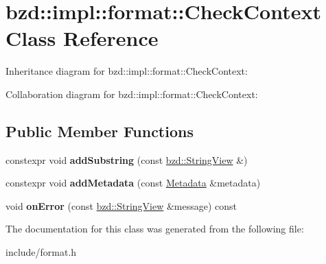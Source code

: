 \hypertarget{classbzd_1_1impl_1_1format_1_1CheckContext}{}\section{bzd\+:\+:impl\+:\+:format\+:\+:Check\+Context Class Reference}
\label{classbzd_1_1impl_1_1format_1_1CheckContext}


Inheritance diagram for bzd\+:\+:impl\+:\+:format\+:\+:Check\+Context\+:


Collaboration diagram for bzd\+:\+:impl\+:\+:format\+:\+:Check\+Context\+:
\subsection*{Public Member Functions}
\begin{DoxyCompactItemize}
\item 
\mbox{\label{classbzd_1_1impl_1_1format_1_1CheckContext_ad7d6065fd6ed9dbb89693b2c93963f61}} 
constexpr void {\bfseries add\+Substring} (const \hyperlink{classbzd_1_1impl_1_1StringView}{bzd\+::\+String\+View} \&)
\item 
\mbox{\label{classbzd_1_1impl_1_1format_1_1CheckContext_acc1926a0431a9387f4450be378092098}} 
constexpr void {\bfseries add\+Metadata} (const \hyperlink{structbzd_1_1impl_1_1format_1_1Metadata}{Metadata} \&metadata)
\item 
\mbox{\label{classbzd_1_1impl_1_1format_1_1CheckContext_a0035d9959b3d944c92a3ffff3c5f32a2}} 
void {\bfseries on\+Error} (const \hyperlink{classbzd_1_1impl_1_1StringView}{bzd\+::\+String\+View} \&message) const
\end{DoxyCompactItemize}


The documentation for this class was generated from the following file\+:\begin{DoxyCompactItemize}
\item 
include/format.\+h\end{DoxyCompactItemize}
